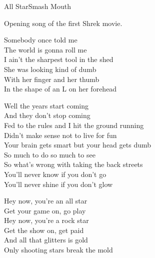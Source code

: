 \documentclass[a4paper,11pt,french]{article}
\begin{document}

\begin{Song}{All Star}{Smash Mouth}

\begin{Paratext}
Opening song of the first Shrek movie.
\end{Paratext}
\espaceParatexteVersMultiColonnes

\begin{multicols}{2}
\begin{Verse}
Somebody once told me\\
The world is gonna roll me\\
I ain't the sharpest tool in the shed\\
She was looking kind of dumb\\
With her finger and her thumb\\
In the shape of an L on her forehead\\
\end{Verse}
\espaceInterStrophe

\begin{PreChorus}
Well the years start coming\\
And they don't stop coming\\
Fed to the rules and I hit the ground running\\
Didn't make sense not to live for fun\\
Your brain gets smart but your head gets dumb\\
So much to do so much to see\\
So what's wrong with taking the back streets\\
You'll never know if you don't go\\
You'll never shine if you don't glow\\
\end{PreChorus}
\espaceInterStrophe

\begin{Chorus}
Hey now, you're an all star\\
Get your game on, go play\\
Hey now, you're a rock star\\
Get the show on, get paid\\
And all that glitters is gold\\
Only shooting stars break the mold\\
\end{Chorus}
\espaceInterStrophe


\end{multicols}
\end{Song}
\end{document}
